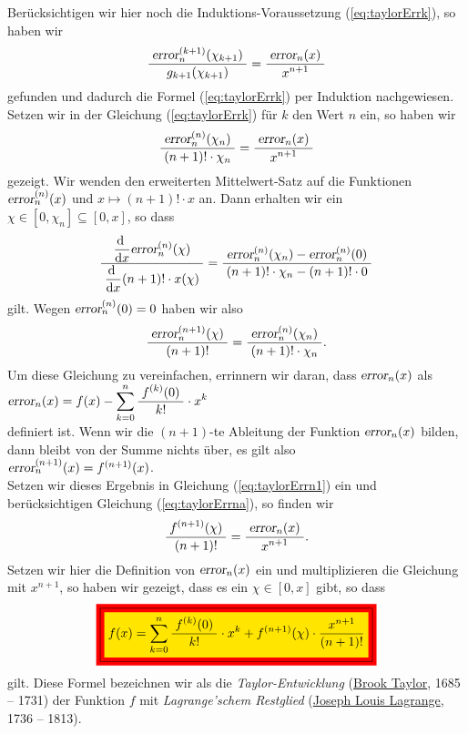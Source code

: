 Ber\"ucksichtigen wir hier noch die Induktions-Voraussetzung (\ref{eq:taylorErrk}),
so haben wir
\begin{equation}
  \label{eq:taylorErrk1}
  \bruch{\erri{\chi_{k+1}}{k+1}}{g_{k+1}(\chi_{k+1})} = \bruch{\textsl{error}_n(x)}{x^{n+1}}
\end{equation}
gefunden und dadurch die Formel (\ref{eq:taylorErrk}) per Induktion nachgewiesen.
Setzen wir in der Gleichung
(\ref{eq:taylorErrk}) f\"ur $k$ den Wert $n$ ein, so haben wir
\begin{equation}
  \label{eq:taylorErrna}
\bruch{\erri{\chi_n}{n}}{(n+1)!\cdot \chi_n} = \bruch{\textsl{error}_n(x)}{x^{n+1}}
\end{equation}
gezeigt. Wir wenden den erweiterten Mittelwert-Satz auf die Funktionen $\erri{x}{n}$
und $x \mapsto (n+1)!\cdot x$ an.  Dann erhalten wir ein $\chi \in [0,\chi_n] \subseteq [0,x]$, so dass
\begin{equation}
  \label{eq:taylorErrn}
  \bruch{\dfo \erri{\chi}{n}}{\dfo (n+1)!\cdot x (\chi)} = 
  \bruch{\erri{\chi_{n}}{n} - \erri{0}{n}}{(n+1)!\cdot \chi_n - (n+1)!\cdot 0}
\end{equation}
gilt.  Wegen $\erri{0}{n} = 0$ haben wir also
\begin{equation}
  \label{eq:taylorErrn1}
  \bruch{\erri{\chi}{n+1}}{(n+1)!} = \bruch{\erri{\chi_{n}}{n}}{(n+1)!\cdot \chi_n}. 
\end{equation}
Um diese Gleichung zu vereinfachen, errinnern wir daran, dass 
$\err{x}$ als 
\\[0.2cm]
\hspace*{1.3cm}
$\err{x} = f(x) - \displaystyle\sum\limits_{k=0}^n \bruch{f^{(k)}(0)}{k!} \cdot  x^k$
\\[0.2cm]
definiert ist.  Wenn wir die $(n+1)$-te Ableitung der Funktion $\err{x}$ bilden, dann bleibt
von der Summe nichts \"uber, es gilt also 
\\[0.2cm]
\hspace*{1.3cm} $\erri{x}{n+1} = f^{(n+1)}(x)$.
\\[0.2cm]
Setzen wir dieses Ergebnis in Gleichung (\ref{eq:taylorErrn1}) ein und ber\"ucksichtigen
Gleichung (\ref{eq:taylorErrna}), so finden wir
\begin{equation}
  \label{eq:taylorErrnn}
    \bruch{f^{(n+1)}(\chi)}{(n+1)!} = \bruch{\textsl{error}_n(x)}{x^{n+1}}. 
\end{equation}
Setzen wir hier die Definition von $\textsl{error}_n(x)$ ein und multiplizieren die Gleichung mit
$x^{n+1}$, so haben wir gezeigt, dass es ein $\chi \in [0,x]$ gibt, so dass
\begin{equation}
  \label{eq:taylorLagrange}
  \colorbox{red}{\framebox{\colorbox{orange}{$\ds f(x) = \sum\limits_{k=0}^n \bruch{f^{(k)}(0)}{k!} \cdot  x^k + f^{(n+1)}(\chi)\cdot \frac{x^{n+1}}{(n+1)!}$}}}
\end{equation}
gilt.  Diese Formel bezeichnen wir als die 
\emph{Taylor-Entwicklung} 
(\href{http://en.wikipedia.org/wiki/Brook_Taylor}{Brook Taylor}, 1685 -- 1731) der Funktion $f$ mit \emph{Lagrange'schem Restglied}
(\href{http://en.wikipedia.org/wiki/Lagrange}{Joseph Louis Lagrange}, 1736 -- 1813). 

